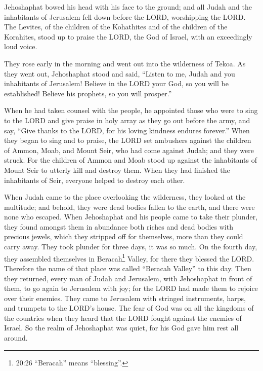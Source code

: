  Jehoshaphat bowed his head with his face to the ground;
and all Judah and the inhabitants of Jerusalem fell down before the
LORD, worshipping the LORD.  The Levites, of the children
of the Kohathites and of the children of the Korahites, stood up to
praise the LORD, the God of Israel, with an exceedingly loud voice.

 They rose early in the morning and went out into the
wilderness of Tekoa. As they went out, Jehoshaphat stood and said,
``Listen to me, Judah and you inhabitants of Jerusalem! Believe in the
LORD your God, so you will be established! Believe his prophets, so you
will prosper.''

 When he had taken counsel with the people, he appointed
those who were to sing to the LORD and give praise in holy array as they
go out before the army, and say, ``Give thanks to the LORD, for his
loving kindness endures forever.''  When they began to sing
and to praise, the LORD set ambushers against the children of Ammon,
Moab, and Mount Seir, who had come against Judah; and they were struck.
 For the children of Ammon and Moab stood up against the
inhabitants of Mount Seir to utterly kill and destroy them. When they
had finished the inhabitants of Seir, everyone helped to destroy each
other.

 When Judah came to the place overlooking the wilderness,
they looked at the multitude; and behold, they were dead bodies fallen
to the earth, and there were none who escaped.  When
Jehoshaphat and his people came to take their plunder, they found
amongst them in abundance both riches and dead bodies with precious
jewels, which they stripped off for themselves, more than they could
carry away. They took plunder for three days, it was so much.
 On the fourth day, they assembled themselves in
Beracah\footnote{20:26 ``Beracah'' means ``blessing''.} Valley, for
there they blessed the LORD. Therefore the name of that place was called
``Beracah Valley'' to this day.  Then they returned, every
man of Judah and Jerusalem, with Jehoshaphat in front of them, to go
again to Jerusalem with joy; for the LORD had made them to rejoice over
their enemies.  They came to Jerusalem with stringed
instruments, harps, and trumpets to the LORD's house.  The
fear of God was on all the kingdoms of the countries when they heard
that the LORD fought against the enemies of Israel.  So the
realm of Jehoshaphat was quiet, for his God gave him rest all around.

